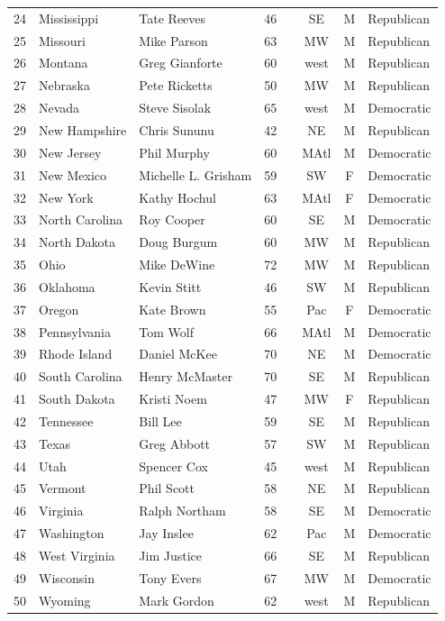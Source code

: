 \documentclass[11pt]{article}
\begin{document}
\begin{table}[ht]
\begin{tabular}{rll c   | c |  ccl}
  24 & Mississippi & Tate Reeves & 46 &  & SE & M & Republican \\ 
  25 & Missouri & Mike Parson & 63 &  & MW & M & Republican \\ 
  26 & Montana & Greg Gianforte & 60 &  & west & M & Republican \\ 
  27 & Nebraska & Pete Ricketts & 50 &  & MW & M & Republican \\ 
  28 & Nevada & Steve Sisolak & 65 &  & west & M & Democratic \\ 
  29 & New Hampshire & Chris Sununu & 42 &  & NE & M & Republican \\ 
  30 & New Jersey & Phil Murphy & 60 &  & MAtl & M & Democratic \\ 
  31 & New Mexico & Michelle L. Grisham & 59 &  & SW & F & Democratic \\ 
  32 & New York & Kathy Hochul & 63 &  & MAtl & F & Democratic \\ 
  33 & North Carolina & Roy Cooper & 60 &  & SE & M & Democratic \\ 
  34 & North Dakota & Doug Burgum & 60 &  & MW & M & Republican \\ 
  35 & Ohio & Mike DeWine & 72 &  & MW & M & Republican \\ 
  36 & Oklahoma & Kevin Stitt & 46 &  & SW & M & Republican \\ 
  37 & Oregon & Kate Brown & 55 &  & Pac & F & Democratic \\ 
  38 & Pennsylvania & Tom Wolf & 66 &  & MAtl & M & Democratic \\ 
  39 & Rhode Island & Daniel McKee & 70 &  & NE & M & Democratic \\ 
  40 & South Carolina & Henry McMaster & 70 &  & SE & M & Republican \\ 
  41 & South Dakota & Kristi Noem & 47 &  & MW & F & Republican \\ 
  42 & Tennessee & Bill Lee & 59 &  & SE & M & Republican \\ 
  43 & Texas & Greg Abbott & 57 &  & SW & M & Republican \\ 
  44 & Utah & Spencer Cox & 45 &  & west & M & Republican \\ 
  45 & Vermont & Phil Scott & 58 &  & NE & M & Republican \\ 
  46 & Virginia & Ralph Northam & 58 &  & SE & M & Democratic \\ 
  47 & Washington & Jay Inslee & 62 &  & Pac & M & Democratic \\ 
  48 & West Virginia & Jim Justice & 66 &  & SE & M & Republican \\ 
  49 & Wisconsin & Tony Evers & 67 &  & MW & M & Democratic \\ 
  50 & Wyoming & Mark Gordon & 62 &  & west & M & Republican \\ 
   \hline
\end{tabular}
\end{table}
\end{document}
